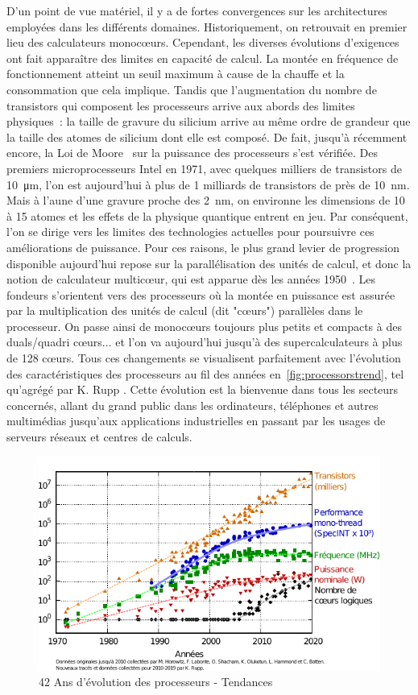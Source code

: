 \documentclass[french, a4paper, 11pt, twoside, pdftex]{StyleThese}
\begin{document}
		D'un point de vue matériel, il y a de fortes convergences sur les architectures employées dans les différents domaines. Historiquement, on retrouvait en premier lieu des calculateurs monocœurs. Cependant, les diverses évolutions d'exigences ont fait apparaître des limites en capacité de calcul. La montée en fréquence de fonctionnement atteint un seuil maximum à cause de la chauffe et la consommation que cela implique. Tandis que l'augmentation du nombre de transistors qui composent les processeurs arrive aux abords des limites physiques~: la taille de gravure du silicium arrive au même ordre de grandeur que la taille des atomes de silicium dont elle est composé. De fait, jusqu'à récemment encore, la Loi de Moore~\cite{thompson_moores_2006} sur la puissance des processeurs s'est vérifiée. Des premiers microprocesseurs Intel en 1971, avec quelques milliers de transistors de \SI{10}{\micro\metre}, l'on est aujourd'hui à plus de 1 milliards de transistors de près de \SI{10}{\nano\metre}. Mais à l'aune d'une gravure proche des \SI{2}{\nano\metre}, on environne les dimensions de 10 à 15 atomes et les effets de la physique quantique entrent en jeu. Par conséquent, l'on se dirige vers les limites des technologies actuelles pour poursuivre ces améliorations de puissance. Pour ces raisons, le plus grand levier de progression disponible aujourd'hui repose sur la parallélisation des unités de calcul, et donc la notion de calculateur multicœur, qui est apparue dès les années 1950~\cite{smotherman_history_2005}. Les fondeurs s'orientent vers des processeurs où la montée en puissance est assurée par la multiplication des unités de calcul (dit "cœurs") parallèles dans le processeur. On passe ainsi de monocœurs toujours plus petits et compacts à des duals/quadri cœurs... et l'on va aujourd'hui jusqu'à des supercalculateurs à plus de 128 cœurs. Tous ces changements se visualisent parfaitement avec l'évolution des caractéristiques des processeurs au fil des années en~\autoref{fig:processorstrend}, tel qu'agrégé par K. Rupp \cite{rupp_42_2020}. Cette évolution est la bienvenue dans tous les secteurs concernés, allant du grand public dans les ordinateurs, téléphones et autres multimédias jusqu'aux applications industrielles en passant par les usages de serveurs réseaux et centres de calculs. %
		\begin{figure}[h!]
			\centering
			\includegraphics[width=0.8\linewidth]{graphiques/processors_trend}
			\caption[Évolution des processeurs]{42 Ans d'évolution des processeurs - Tendances}
			\label{fig:processorstrend}
		\end{figure}
		
\end{document}
